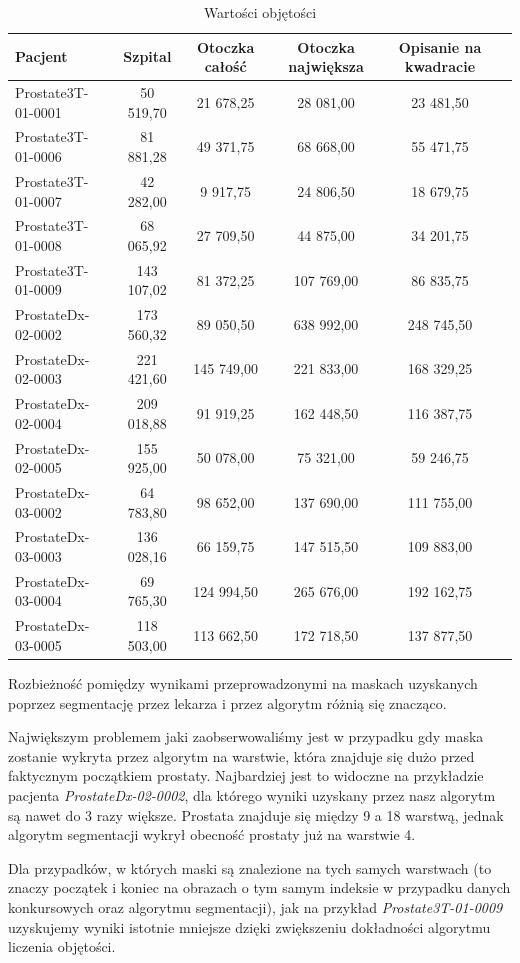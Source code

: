 \documentclass[a4paper,11pt,twoside]{report}
\theoremstyle{definition}
\begin{document}
\begin{table}[h!]
\caption{Wartości objętości}
\centering
\begin{tabular}{|l|c|c|c|c|c|} \hline  
Pacjent	& Szpital & Otoczka całość & Otoczka największa & Opisanie na kwadracie  \\ \hline 
Prostate3T-01-0001 & 50 519,70    	 & 21 678,25  &  	 28 081,00  &  	 23 481,50   \\ \hline 
Prostate3T-01-0006 & 81 881,28    	 & 49 371,75  &  	 68 668,00  &  	 55 471,75   \\ \hline 
Prostate3T-01-0007 & 42 282,00    	 & 9 917,75   & 	 24 806,50  &  	 18 679,75   \\ \hline 
Prostate3T-01-0008 & 68 065,92    	 & 27 709,50  &  	 44 875,00  &  	 34 201,75   \\ \hline 
Prostate3T-01-0009 & 143 107,02    	 & 81 372,25  &  	 107 769,00 &    86 835,75   \\ \hline 
ProstateDx-02-0002 & 173 560,32    	 & 89 050,50  &  	 638 992,00 &    248 745,50  \\ \hline  
ProstateDx-02-0003 & 221 421,60    	 & 145 749,00 &   	 221 833,00 &    168 329,25  \\ \hline  
ProstateDx-02-0004 & 209 018,88    	 & 91 919,25  &  	 162 448,50 &    116 387,75  \\ \hline  
ProstateDx-02-0005 & 155 925,00    	 & 50 078,00  &  	 75 321,00  &  	 59 246,75   \\ \hline 
ProstateDx-03-0002 & 64 783,80    	 & 98 652,00  &  	 137 690,00 &    111 755,00  \\ \hline  
ProstateDx-03-0003 & 136 028,16    	 & 66 159,75  &  	 147 515,50 &    109 883,00  \\ \hline  
ProstateDx-03-0004 & 69 765,30    	 & 124 994,50 &   	 265 676,00 &    192 162,75  \\ \hline  
ProstateDx-03-0005 & 118 503,00    	 & 113 662,50 &    	 172 718,50 &    137 877,50  \\ \hline  
\end{tabular}
\label{Objętości pacjenci}
\end{table}

Rozbieżność pomiędzy wynikami przeprowadzonymi na maskach uzyskanych poprzez segmentację przez lekarza i przez algorytm różnią się znacząco. 
\par
Największym problemem jaki zaobserwowaliśmy jest w przypadku gdy maska zostanie wykryta przez algorytm na warstwie, która znajduje się dużo przed faktycznym początkiem prostaty. Najbardziej jest to widoczne na przykładzie pacjenta \textit{ProstateDx-02-0002}, dla którego wyniki uzyskany przez nasz algorytm są nawet do 3 razy większe. Prostata znajduje się między 9 a 18 warstwą, jednak algorytm segmentacji wykrył obecność prostaty już na warstwie 4. 
\par 
Dla przypadków, w których maski są znalezione na tych samych warstwach (to znaczy początek i koniec na obrazach o tym samym indeksie w przypadku danych konkursowych oraz algorytmu segmentacji), jak na przykład \textit{Prostate3T-01-0009} uzyskujemy wyniki istotnie mniejsze dzięki zwiększeniu dokładności algorytmu liczenia objętości.
\end{document}

